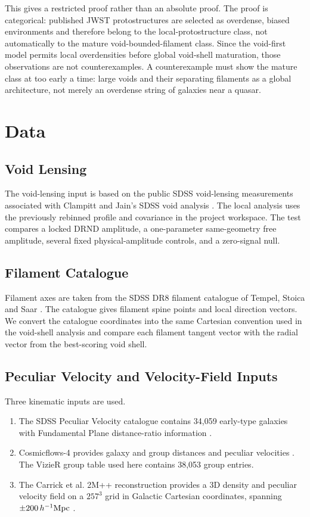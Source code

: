 \documentclass[11pt,a4paper]{article}
\begin{document}
This gives a restricted proof rather than an absolute proof. The proof is categorical: published JWST protostructures are selected as overdense, biased environments and therefore belong to the local-protostructure class, not automatically to the mature void-bounded-filament class. Since the void-first model permits local overdensities before global void-shell maturation, those observations are not counterexamples. A counterexample must show the mature class at too early a time: large voids and their separating filaments as a global architecture, not merely an overdense string of galaxies near a quasar.

\section{Data}

\subsection{Void Lensing}

The void-lensing input is based on the public SDSS void-lensing measurements associated with Clampitt and Jain's SDSS void analysis \cite{clampitt2015}. The local analysis uses the previously rebinned profile and covariance in the project workspace. The test compares a locked DRND amplitude, a one-parameter same-geometry free amplitude, several fixed physical-amplitude controls, and a zero-signal null.

\subsection{Filament Catalogue}

Filament axes are taken from the SDSS DR8 filament catalogue of Tempel, Stoica and Saar \cite{tempel2014}. The catalogue gives filament spine points and local direction vectors. We convert the catalogue coordinates into the same Cartesian convention used in the void-shell analysis and compare each filament tangent vector with the radial vector from the best-scoring void shell.

\subsection{Peculiar Velocity and Velocity-Field Inputs}

Three kinematic inputs are used.

\begin{enumerate}[leftmargin=1.2cm]
  \item The SDSS Peculiar Velocity catalogue contains 34,059 early-type galaxies with Fundamental Plane distance-ratio information \cite{howlett2022zenodo,howlett2022}.
  \item Cosmicflows-4 provides galaxy and group distances and peculiar velocities \cite{tully2023}. The VizieR group table used here contains 38,053 group entries.
  \item The Carrick et al. 2M++ reconstruction provides a 3D density and peculiar velocity field on a $257^3$ grid in Galactic Cartesian coordinates, spanning $\pm200\,h^{-1}{\rm Mpc}$ \cite{carrick2015}.
\end{enumerate}
\end{document}
